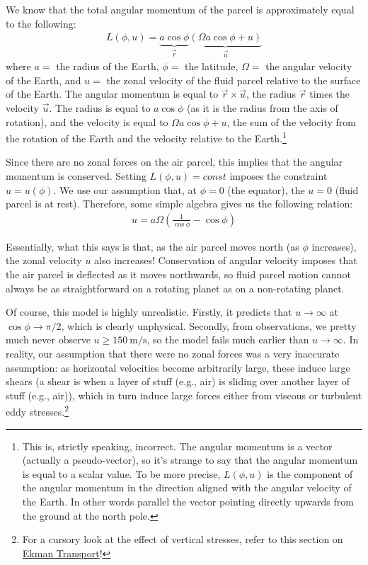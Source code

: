 We know that the total angular momentum of the parcel is approximately equal to the following:
\begin{align*}
    L(\phi,u) = \underbrace{a\cos\phi}_{\vec{r}} \underbrace{\left( \Omega a \cos \phi + u \right)}_{\vec{u}}
\end{align*}
where $a=$ the radius of the Earth, $\phi=$ the latitude, $\Omega=$ the angular velocity of the Earth, and $u=$ the zonal velocity of the fluid parcel relative to the surface of the Earth. The angular momentum is equal to $\vec{r}\times\vec{u}$, the radius $\vec{r}$ times the velocity $\vec{u}$. The radius is equal to $a\cos\phi$ (as it is the radius from the axis of rotation), and the velocity is equal to $\Omega a \cos \phi + u$, the sum of the velocity from the rotation of the Earth and the velocity relative to the Earth.\footnote{
    This is, strictly speaking, incorrect. The angular momentum is a vector (actually a pseudo-vector), so it’s strange to say that the angular momentum is equal to a scalar value. To be more precise, $L(\phi,u)$ is the component of the angular momentum in the direction aligned with the angular velocity of the Earth. In other words parallel the vector pointing directly upwards from the ground at the north pole.
}

Since there are no zonal forces on the air parcel, this implies that the angular momentum is conserved. Setting $L(\phi,u)=const$ imposes the constraint $u=u(\phi)$. We use our assumption that, at $\phi=0$ (the equator), the $u=0$ (fluid parcel is at rest). Therefore, some simple algebra gives us the following relation:
\begin{align*}
    \boxed{u=a\Omega \left( \frac{1}{\cos\phi}-\cos\phi
    \right)}
\end{align*}

Essentially, what this says is that, as the air parcel moves north (as $\phi$ increases), the zonal velocity $u$ also increases! Conservation of angular velocity imposes that the air parcel is deflected as it moves northwards, so fluid parcel motion cannot always be as straightforward on a rotating planet as on a non-rotating planet.

Of course, this model is highly unrealistic. Firstly, it predicts that $u\to\infty$ at $\cos\phi\to\pi/2$, which is clearly unphysical. Secondly, from observations, we pretty much never observe $u\geq\qty{150}{\metre\per\second}$, so the model fails much earlier than $u\to\infty$. In reality, our assumption that there were no zonal forces was a very inaccurate assumption: as horizontal velocities become arbitrarily large, these induce large shears (a shear is when a layer of stuff (e.g., air) is sliding over another layer of stuff (e.g., air)), which in turn induce large forces either from viscous or turbulent eddy stresses.\footnote{For a cursory look at the effect of vertical stresses, refer to this section on \hyperref[Ekman Transport]{Ekman Transport}!}

